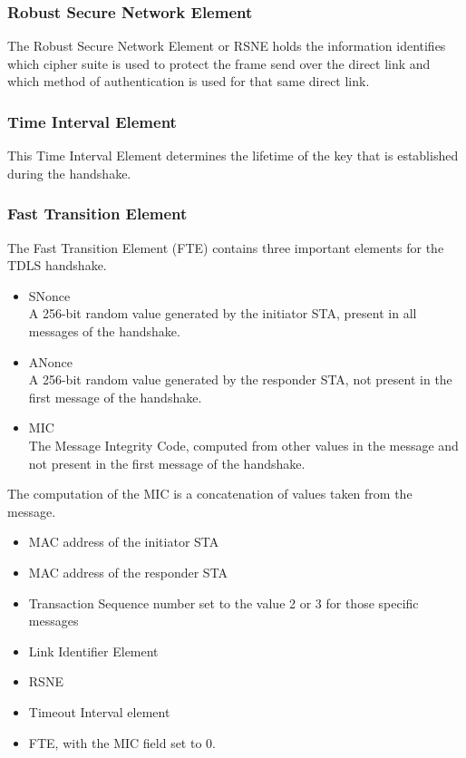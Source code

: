 \subsubsection{Robust Secure Network Element}

The Robust Secure Network Element or RSNE holds the information identifies which cipher suite is used to protect the frame send over the direct link and which method of authentication is used for that same direct link.

\subsubsection{Time Interval Element}

This Time Interval Element determines the lifetime of the key that is established during the handshake.

\subsubsection{Fast Transition Element}

The Fast Transition Element (FTE) contains three important elements for the TDLS handshake.

\begin{itemize}
	\item SNonce\\ A 256-bit random value generated by the initiator STA, present in all messages of the handshake.
	\item ANonce\\ A 256-bit random value generated by the responder STA, not present in the first message of the handshake.
	\item MIC\\ The Message Integrity Code, computed from other values in the message and not present in the first message of the handshake.
\end{itemize}


The computation of the MIC is a concatenation of values taken from the message.

\begin{itemize}
	\item MAC address of the initiator STA
	\item MAC address of the responder STA
	\item Transaction Sequence number set to the value 2 or 3 for those specific messages
	\item Link Identifier Element
	\item RSNE
	\item Timeout Interval element
	\item FTE, with the MIC field set to 0.
\end{itemize}

